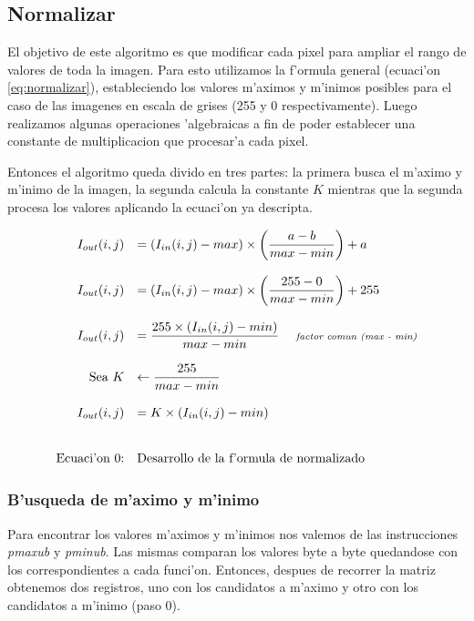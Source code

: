 \subsection{Normalizar}
El objetivo de este algoritmo es que modificar cada pixel para ampliar el rango de valores de toda la imagen. Para esto utilizamos la f'ormula general (ecuaci'on \ref{eq:normalizar}), estableciendo los valores m'aximos y m'inimos posibles para el caso de las imagenes en escala de grises (255 y 0 respectivamente). Luego realizamos algunas operaciones 'algebraicas a fin de poder establecer una constante de multiplicacion que procesar'a cada pixel.

Entonces el algoritmo queda divido en tres partes: la primera busca el m'aximo y m'inimo de la imagen, la segunda calcula la constante $K$ mientras que la segunda procesa los valores aplicando la ecuaci'on ya descripta.

\begin{equation}
\begin{array}{rl}
I_{out}(i,j) &= (I_{in}(i,j) - max) \times \left( \dfrac{a-b}{max-min} \right) + a  \\
\\
I_{out}(i,j) &= (I_{in}(i,j) - max) \times \left( \dfrac{255-0}{max-min} \right) + 255  \\
\\
I_{out}(i,j) &= \dfrac{255 \times (I_{in}(i,j) - min)}{max-min}  $\hspace{10pt} \textit{\scriptsize factor comun (max - min)}$ \\
\\
$Sea $ K &\leftarrow \dfrac{255}{max-min}  \\
\\
I_{out}(i,j) &= K \times (I_{in}(i,j) - min) \\
\\ \\
$Ecuaci'on \theequation:$&$Desarrollo de la f'ormula de normalizado$
\end{array} 
\label{eq:normalizar}
\end{equation}


\subsubsection*{B'usqueda de m'aximo y m'inimo}

Para encontrar los valores m'aximos y m'inimos nos valemos de las instrucciones \textit{pmaxub} y \textit{pminub}. Las mismas comparan los valores byte a byte quedandose con los correspondientes a cada funci'on. Entonces, despues de recorrer la matriz obtenemos dos registros, uno con los candidatos a m'aximo y otro con los candidatos a m'inimo (paso 0). 

